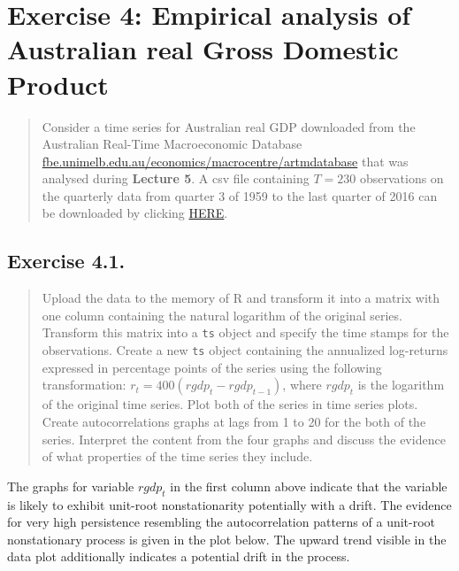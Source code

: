 \documentclass[
  letterpaper,
  DIV=11,
  numbers=noendperiod]{scrreprt}
\begin{document}
\hypertarget{exercise-4-empirical-analysis-of-australian-real-gross-domestic-product}{%
\section*{Exercise 4: Empirical analysis of Australian real Gross
Domestic
Product}\label{exercise-4-empirical-analysis-of-australian-real-gross-domestic-product}}

\begin{quote}
Consider a time series for Australian real GDP downloaded from the
Australian Real-Time Macroeconomic Database
\href{http://fbe.unimelb.edu.au/economics/macrocentre/artmdatabase}{fbe.unimelb.edu.au/economics/macrocentre/artmdatabase}
that was analysed during \textbf{Lecture 5}. A csv file containing
\(T=230\) observations on the quarterly data from quarter 3 of 1959 to
the last quarter of 2016 can be downloaded by clicking
\href{https://unimelbcloud-my.sharepoint.com/:x:/g/personal/tomasz_wozniak_unimelb_edu_au/EUGgK79jyPBLoglnoVq75lEBI5k7TB7bEXFCemLDWnqyCg?e=9C8wHr}{HERE}.
\end{quote}

\hypertarget{exercise-4.1.}{%
\subsection*{Exercise 4.1.}\label{exercise-4.1.}}

\begin{quote}
Upload the data to the memory of R and transform it into a matrix with
one column containing the natural logarithm of the original series.
Transform this matrix into a \texttt{ts} object and specify the time
stamps for the observations. Create a new \texttt{ts} object containing
the annualized log-returns expressed in percentage points of the series
using the following transformation: \(r_t = 400(rgdp_t - rgdp_{t-1})\),
where \(rgdp_t\) is the logarithm of the original time series. Plot both
of the series in time series plots. Create autocorrelations graphs at
lags from 1 to 20 for the both of the series. Interpret the content from
the four graphs and discuss the evidence of what properties of the time
series they include.
\end{quote}

The graphs for variable \(rgdp_t\) in the first column above indicate
that the variable is likely to exhibit unit-root nonstationarity
potentially with a drift. The evidence for very high persistence
resembling the autocorrelation patterns of a unit-root nonstationary
process is given in the plot below. The upward trend visible in the data
plot additionally indicates a potential drift in the process.
\end{document}
